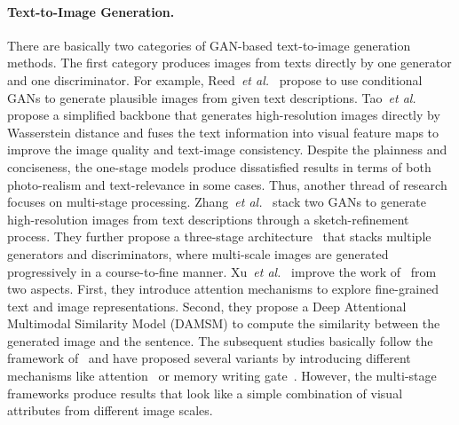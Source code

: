 \documentclass[final]{cvpr}
\def\etal{\emph{et al.}}
\begin{document}
\paragraph{Text-to-Image Generation.}
There are basically two categories of GAN-based text-to-image generation methods.
The first category produces images from texts directly by one generator and one discriminator.
For example, Reed~\etal~\cite{reed2016generative} propose to use conditional GANs to generate plausible images from given text descriptions. 
Tao~\etal~\cite{tao2020dfgan} propose a simplified backbone that generates high-resolution images directly by Wasserstein distance and fuses the text information into visual feature maps to improve the image quality and text-image consistency.
Despite the plainness and conciseness, the one-stage models produce dissatisfied results in terms of both photo-realism and text-relevance in some cases.
Thus, another thread of research focuses on multi-stage processing.
Zhang~\etal~\cite{zhang2017stackgan} stack two GANs to generate high-resolution images from text descriptions through a sketch-refinement process.
They further propose a three-stage architecture~\cite{zhang2018stackgan++} that stacks multiple generators and discriminators, where multi-scale images are generated progressively in a course-to-fine manner.
Xu~\etal~\cite{xu2018attngan} improve the work of~\cite{zhang2018stackgan++} from two aspects. 
First, they introduce attention mechanisms to explore fine-grained text and image representations.
Second, they propose a Deep Attentional Multimodal Similarity Model (DAMSM) to compute the similarity between the generated image and the sentence.
The subsequent studies basically follow the framework of~\cite{xu2018attngan} and have proposed several variants by introducing different mechanisms like attention~\cite{li2019control} or memory writing gate~\cite{zhu2019dmgan}.
However, the multi-stage frameworks produce results that look like a simple combination of visual attributes from different image scales.

\vspace{-5pt}
\end{document}
